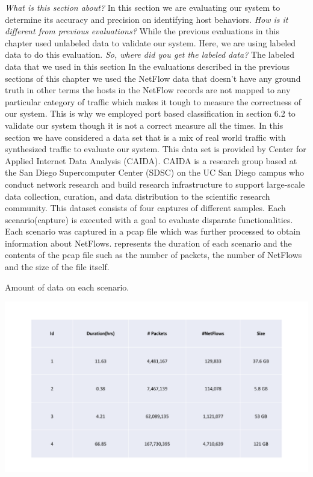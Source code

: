 \textit{What is this section about?} In this section we are evaluating our system to determine its accuracy and precision on identifying host behaviors.
\textit{How is it different from previous evaluations?} While the previous evaluations in this chapter used unlabeled data to validate our system. Here, we are using labeled data to do this evaluation.
\textit{So, where did you get the labeled data?} The labeled data that we used in this section  
In the evaluations described in the previous sections of this chapter we used the NetFlow data that doesn't have any ground truth in other terms the hosts in the NetFlow records are not mapped to any particular category of traffic which makes it tough to measure the correctness of our system. This is why we employed port based classification in section 6.2 to validate our system though it is not a correct measure all the times. In this section we have considered a data set that is a mix of real world traffic with synthesized traffic to evaluate our system. This data set is provided by Center for Applied Internet Data Analysis (CAIDA). CAIDA is a research group based at the San Diego Supercomputer Center (SDSC) on the UC San Diego campus who conduct network research and build research infrastructure to support large-scale data collection, curation, and data distribution to the scientific research community. This dataset consists of four captures of different samples. Each scenario(capture) is executed with a goal to evaluate disparate functionalities. Each scenario was captured in a pcap file which was further processed to obtain information about NetFlows.  represents the duration of each scenario and the contents of the pcap file such as the number of packets, the number of NetFlows and the size of the file itself. 
\begin{table}[t]
	\caption{Amount of data on each scenario.}%
	\centerline{\includegraphics[scale = 0.5]{synth_desc.pdf}}	
\end{table}

